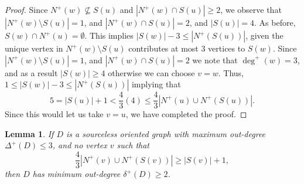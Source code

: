 \documentclass[12pt]{article}
\newtheorem{lemma}[theorem]{Lemma}
\theoremstyle{definition}
\begin{document}
\begin{proof}
    Since $N^+(w)\not\subseteq S(u)$ and $|N^+(w) \cap S(u)|\geq 2$,
    we observe that $|N^+(w)\setminus S(u)| = 1$, and $|N^+(w) \cap S(u)|= 2$, and $|S(u)| = 4$.
    As before, $S(w) \cap N^+(u) = \emptyset$.
    This implies $|S(w)| - 3 \leq |N^+(S(u))|$, given the unique vertex in $N^+(w)\setminus S(u)$
    contributes at most $3$ vertices to $S(w)$.
    Since $|N^+(w)\setminus S(u)| = 1$, and $|N^+(w) \cap S(u)|= 2$ we note that 
    $\deg^+(w) = 3$, and as a result $|S(w)|\geq 4$ otherwise we can choose $v = w$.
    Thus, $1\leq |S(w)| - 3 \leq |N^+(S(u))|$ implying that
    \[
    5 = |S(u)| + 1 < \frac{4}{3}(4) \leq \frac{4}{3}|N^+(u) \cup N^+(S(u))|.
    \]
    Since this would let us take $v = u$, we have completed the proof.   
\end{proof}




\begin{lemma}\label{Lemma: out-3, min-1}
   If $D$ is a sourceless oriented graph with maximum out-degree $\Delta^+(D)\leq 3$,
   and no vertex $v$ such that
    \[
    \frac{4}{3}|N^+(v) \cup N^+(S(v))| \geq |S(v)|+1,
    \]
    then $D$ has minimum out-degree $\delta^+(D)\geq 2$.
\end{lemma}
\end{document}
